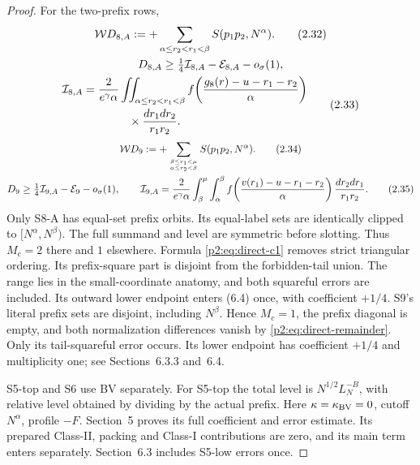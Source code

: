 \begin{proof}
For the two-prefix rows,
\begin{gather}
 \mathcal W D_{8,A}:=+\sum_{\alpha\le r_2<r_1<\beta}S(p_1p_2,N^\alpha).
 \tag{2.32}\label{p2:eq:2.32}\\
 D_{8,A}\ge\tfrac14\mathcal I_{8,A}-\mathcal E_{8,A}-o_\sigma(1),\notag\\
 \begin{aligned}
 \mathcal I_{8,A}
   &=\frac{2}{e^\gamma\alpha}
     \iint_{\alpha\le r_2<r_1<\beta}
     f\!\left(\frac{g_8(r)-u-r_1-r_2}{\alpha}\right)\\
   &\qquad\qquad\times\frac{dr_1dr_2}{r_1r_2}.
 \end{aligned}
 \tag{2.33}\label{p2:eq:2.33}
\end{gather}
\begin{gather}
 \mathcal W D_9:=+\sum_{\beta\le r_1<\mu\atop\alpha\le r_2<\beta}
 S(p_1p_2,N^\alpha).
 \tag{2.34}\label{p2:eq:2.34}\\
 D_9\ge\tfrac14\mathcal I_{9,A}-\mathcal E_9-o_\sigma(1),\qquad
 \mathcal I_{9,A}=\frac{2}{e^\gamma\alpha}
 \int_\beta^\mu\int_\alpha^\beta
 f\!\left(\frac{v(r_1)-u-r_1-r_2}{\alpha}\right)
 \frac{dr_2dr_1}{r_1r_2}.
 \tag{2.35}\label{p2:eq:2.35}
\end{gather}
Only S8-A has equal-set prefix orbits.
Its equal-label sets are identically clipped to $[N^\alpha,N^\beta)$.
The full summand and level are symmetric before slotting.
Thus $M_c=2$ there and $1$ elsewhere.
Formula \eqref{p2:eq:direct-c1} removes strict triangular ordering.
Its prefix-square part is disjoint from the forbidden-tail union.
The range lies in the small-coordinate anatomy, and both squareful errors are included.
Its outward lower endpoint enters (6.4) once, with coefficient $+1/4$.
S9's literal prefix sets are disjoint, including $N^\beta$.
Hence $M_c=1$, the prefix diagonal is empty,
and both normalization differences vanish by \eqref{p2:eq:direct-remainder}.
Only its tail-squareful error occurs.
Its lower endpoint has coefficient $+1/4$ and multiplicity one;
see Sections~6.3.3 and~6.4.

S5-top and S6 use BV separately.
For S5-top the total level is $N^{1/2}L_N^{-B}$,
with relative level obtained by dividing by the actual prefix.
Here $\kappa=\kappa_{\rm BV}=0$, cutoff $N^\alpha$, profile $-F$.
Section~5 proves its full coefficient and error estimate.
Its prepared Class-II, packing and Class-I contributions are zero,
and its main term enters separately.
Section~6.3 includes S5-low errors once.

\end{proof}
